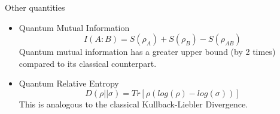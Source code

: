 \begin{frame}{Other quantities}
    \begin{itemize}
        \item Quantum Mutual Information
        $$I(A:B) = S(\rho_A) + S(\rho_B) - S(\rho_{AB})$$
        Quantum mutual information has a greater upper bound (by 2 times) compared to its classical counterpart.
        \item Quantum Relative Entropy
        $$D(\rho || \sigma) = Tr[\rho (log(\rho) - log(\sigma))]$$
        This is analogous to the classical Kullback-Liebler Divergence.
    \end{itemize}
\end{frame}